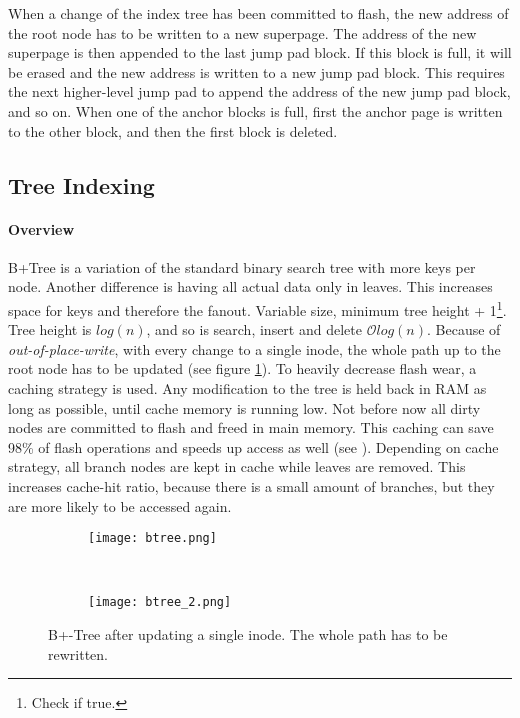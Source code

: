 When a change of the index tree has been committed to flash, the new address of the root node has to be written to a new superpage. The address of the new superpage is then appended to the last jump pad block. If this block is full, it will be erased and the new address is written to a new jump pad block. This requires the next higher-level jump pad to append the address of the new jump pad block, and so on. When one of the anchor blocks is full, first the anchor page is written to the other block, and then the first block is deleted.\\



\subsection{Tree Indexing}
\label{b+tree}
\paragraph{Overview}
B+Tree is a variation of the standard binary search tree with more keys per node. Another difference is having all actual data only in leaves. This increases space for keys and therefore the fanout. Variable size, minimum tree height + 1\footnote{Check if true.}. Tree height is $log(n)$, and so is search, insert and delete $\mathcal{O}log(n)$. Because of \textit{out-of-place-write}, with every change to a single inode, the whole path up to the root node has to be updated (see figure \ref{fig:btreewandering}). To heavily decrease flash wear, a caching strategy is used. Any modification to the tree is held back in RAM as long as possible, until cache memory is running low. Not before now all dirty nodes are committed to flash and freed in main memory. This caching can save 98\% of flash operations and speeds up access as well (see ). Depending on cache strategy, all branch nodes are kept in cache while leaves are removed. This increases cache-hit ratio, because there is a small amount of branches, but they are more likely to be accessed again.

\begin{figure}[htp]
	\centering
	\begin{subfigure}[t]{.9\textwidth}
		\centering\texttt{[image: btree.png]}
	\end{subfigure}\\
	\begin{subfigure}[t]{.9\textwidth}
		\centering\texttt{[image: btree\_2.png]}
	\end{subfigure}
	\caption{\label{fig:btreewandering}B+-Tree after updating a single inode. The whole path has to be rewritten.}
\end{figure}

